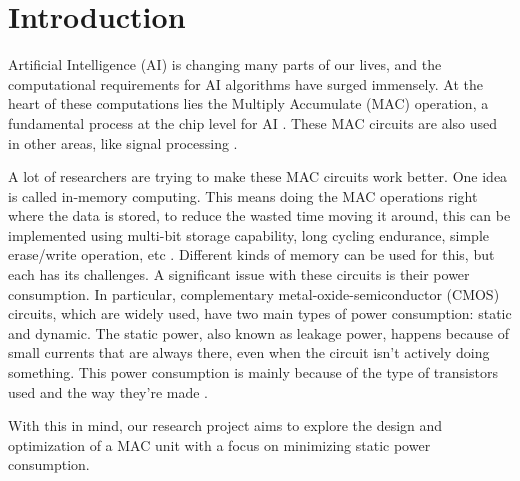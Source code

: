 \section{Introduction}

Artificial Intelligence (AI) is changing many parts of our lives, and the computational requirements for AI algorithms have surged immensely.  At the heart of these computations lies the Multiply Accumulate (MAC) operation, a fundamental process at the chip level for AI \cite{wang_2021_an}. These MAC circuits are also used in other areas, like signal processing \cite{ntnudepartmentofelectronicsystems_2023_project}.

A lot of researchers are trying to make these MAC circuits work better. One idea is called in-memory computing. This means doing the MAC operations right where the data is stored, to reduce the wasted time moving it around, this can be implemented using multi-bit storage capability, long cycling endurance, simple erase/write operation, etc \cite{wang_2021_an}. Different kinds of memory can be used for this, but each has its challenges. A significant issue with these circuits is their power consumption. In particular, complementary metal-oxide-semiconductor (CMOS) circuits, which are widely used, have two main types of power consumption: static and dynamic. The static power, also known as leakage power, happens because of small currents that are always there, even when the circuit isn't actively doing something. This power consumption is mainly because of the type of transistors used and the way they're made \cite{beloglazov_2011_advances}.

With this in mind, our research project aims to explore the design and optimization of a MAC unit with a focus on minimizing static power consumption.